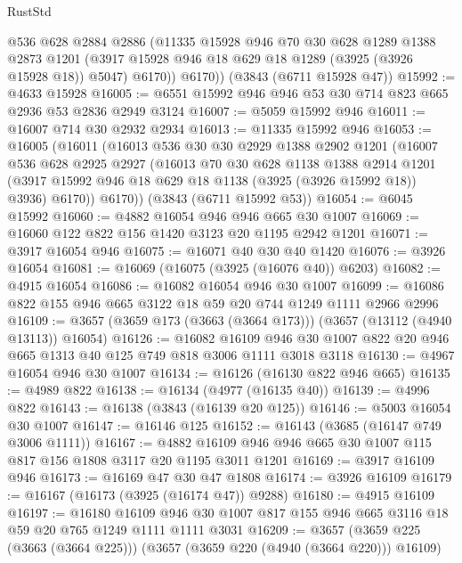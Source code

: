 \begin{lexlean}{RustStd}
\begin{coremodule}
          @536
          @628
          @2884
          @2886
          (@11335
            @15928
            @946
            @70
            @30
            @628
            @1289
            @1388
            @2873
            @1201
            (@3917 @15928 @946 @18 @629 @18 @1289 (@3925 (@3926 @15928 @18)) @5047)
            @6170))
        @6170))
    (@3843 (@6711 @15928 @47))
@15992 := @4633 @15928
@16005 := @6551 @15992 @946 @946 @53 @30 @714 @823 @665 @2936 @53 @2836 @2949 @3124
@16007 := @5059 @15992 @946
@16011 := @16007 @714 @30 @2932 @2934
@16013 := @11335 @15992 @946
@16053 := @16005
    (@16011
      (@16013
        @536
        @30
        @30
        @2929
        @1388
        @2902
        @1201
        (@16007
          @536
          @628
          @2925
          @2927
          (@16013
            @70
            @30
            @628
            @1138
            @1388
            @2914
            @1201
            (@3917 @15992 @946 @18 @629 @18 @1138 (@3925 (@3926 @15992 @18)) @3936)
            @6170))
        @6170))
    (@3843 (@6711 @15992 @53))
@16054 := @6045 @15992
@16060 := @4882 @16054 @946 @946 @665 @30 @1007
@16069 := @16060 @122 @822 @156 @1420 @3123 @20 @1195 @2942 @1201
@16071 := @3917 @16054 @946
@16075 := @16071 @40 @30 @40 @1420
@16076 := @3926 @16054
@16081 := @16069 (@16075 (@3925 (@16076 @40)) @6203)
@16082 := @4915 @16054
@16086 := @16082 @16054 @946 @30 @1007
@16099 := @16086 @822 @155 @946 @665 @3122 @18 @59 @20 @744 @1249 @1111 @2966 @2996
@16109 := @3657 (@3659 @173 (@3663 (@3664 @173))) (@3657 (@13112 (@4940 @13113)) @16054)
@16126 := @16082
    @16109
    @946
    @30
    @1007
    @822
    @20
    @946
    @665
    @1313
    @40
    @125
    @749
    @818
    @3006
    @1111
    @3018
    @3118
@16130 := @4967 @16054 @946 @30 @1007
@16134 := @16126 (@16130 @822 @946 @665)
@16135 := @4989 @822
@16138 := @16134 (@4977 (@16135 @40))
@16139 := @4996 @822
@16143 := @16138 (@3843 (@16139 @20 @125))
@16146 := @5003 @16054 @30 @1007
@16147 := @16146 @125
@16152 := @16143 (@3685 (@16147 @749 @3006 @1111))
@16167 := @4882 @16109 @946 @946 @665 @30 @1007 @115 @817 @156 @1808 @3117 @20 @1195 @3011 @1201
@16169 := @3917 @16109 @946
@16173 := @16169 @47 @30 @47 @1808
@16174 := @3926 @16109
@16179 := @16167 (@16173 (@3925 (@16174 @47)) @9288)
@16180 := @4915 @16109
@16197 := @16180
    @16109
    @946
    @30
    @1007
    @817
    @155
    @946
    @665
    @3116
    @18
    @59
    @20
    @765
    @1249
    @1111
    @1111
    @3031
@16209 := @3657 (@3659 @225 (@3663 (@3664 @225))) (@3657 (@3659 @220 (@4940 (@3664 @220))) @16109)

\end{coremodule}
\end{lexlean}
